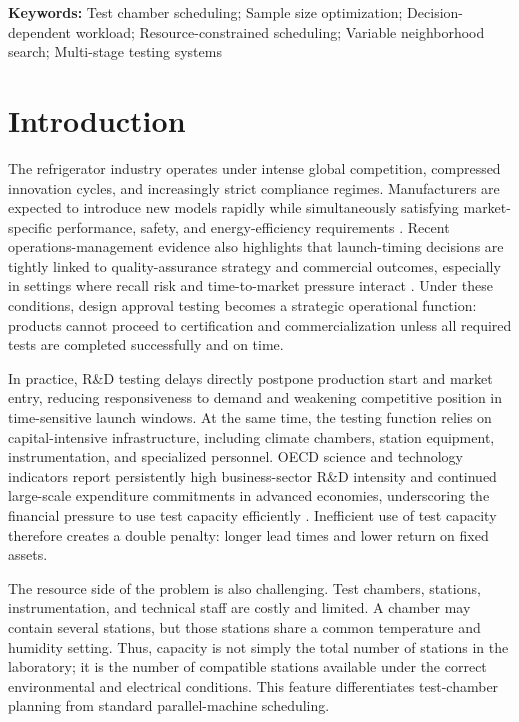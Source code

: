 \documentclass[11pt]{article}
\begin{document}
\textbf{Keywords:} Test chamber scheduling; Sample size optimization; Decision-dependent workload; Resource-constrained scheduling; Variable neighborhood search; Multi-stage testing systems

\section{Introduction}
\label{sec:intro}

The refrigerator industry operates under intense global competition, compressed innovation cycles, and increasingly strict compliance regimes. Manufacturers are expected to introduce new models rapidly while simultaneously satisfying market-specific performance, safety, and energy-efficiency requirements \citep{IEA2021,IEC60335-1,IEC60335-2-24,IEC62552}. Recent operations-management evidence also highlights that launch-timing decisions are tightly linked to quality-assurance strategy and commercial outcomes, especially in settings where recall risk and time-to-market pressure interact \citep{KimKoenigsbergOfek2022}. Under these conditions, design approval testing becomes a strategic operational function: products cannot proceed to certification and commercialization unless all required tests are completed successfully and on time.

In practice, R\&D testing delays directly postpone production start and market entry, reducing responsiveness to demand and weakening competitive position in time-sensitive launch windows. At the same time, the testing function relies on capital-intensive infrastructure, including climate chambers, station equipment, instrumentation, and specialized personnel. OECD science and technology indicators report persistently high business-sector R\&D intensity and continued large-scale expenditure commitments in advanced economies, underscoring the financial pressure to use test capacity efficiently \citep{OECD_MSTI2024,OECD_MSTI2025}. Inefficient use of test capacity therefore creates a double penalty: longer lead times and lower return on fixed assets.

The resource side of the problem is also challenging. Test chambers, stations, instrumentation, and technical staff are costly and limited. A chamber may contain several stations, but those stations share a common temperature and humidity setting. Thus, capacity is not simply the total number of stations in the laboratory; it is the number of compatible stations available under the correct environmental and electrical conditions. This feature differentiates test-chamber planning from standard parallel-machine scheduling.
\end{document}
